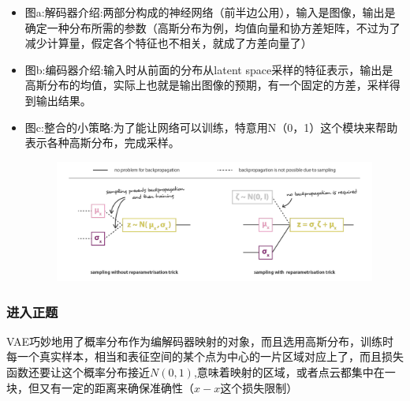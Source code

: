 \documentclass[]{report}
\begin{document}
\FloatBarrier
\begin{itemize}
	\item 图a:解码器介绍:两部分构成的神经网络（前半边公用），输入是图像，输出是确定一种分布所需的参数（高斯分布为例，均值向量和协方差矩阵，不过为了减少计算量，假定各个特征也不相关，就成了方差向量了）
	\item 图b:编码器介绍:输入时从前面的分布从latent space采样的特征表示，输出是高斯分布的均值，实际上也就是输出图像的预期，有一个固定的方差，采样得到输出结果。
	\item 图c:整合的小策略:为了能让网络可以训练，特意用N（0，1）这个模块来帮助表示各种高斯分布，完成采样。
	\begin{figure}[h]
		\centering
		\includegraphics[width=0.7\linewidth]{images/screenshot013}
		\label{fig:screenshot013}
	\end{figure}
	
\end{itemize}
\subsubsection{进入正题}
VAE巧妙地用了概率分布作为编解码器映射的对象，而且选用高斯分布，训练时每一个真实样本，相当和表征空间的某个点为中心的一片区域对应上了，而且损失函数还要让这个概率分布接近$N(0,1)$,意味着映射的区域，或者点云都集中在一块，但又有一定的距离来确保准确性（$\hat{x}-x$这个损失限制）
\end{document}
